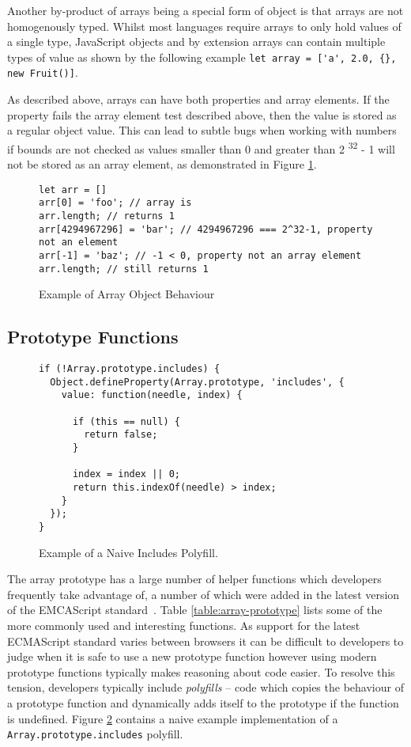 \documentclass[]{final_report}
\begin{document}
Another by-product of arrays being a special form of object is that arrays are not homogenously typed. Whilst most languages require arrays to only hold values of a single type, JavaScript objects and by extension arrays can contain multiple types of value as shown by the following example \lstinline|let array = ['a', 2.0, {}, new Fruit()]|. 

As described above, arrays can have both properties and array elements. If the property fails the array element test described above, then the value is stored as a regular object value. This can lead to subtle bugs when working with numbers if bounds are not checked as values smaller than 0 and greater than 2  \textsuperscript{32} - 1 will not be stored as an array element, as demonstrated in Figure \ref{fig:js-array-max-length}.

\begin{figure}[t]
\begin{verbatim}
let arr = []
arr[0] = 'foo'; // array is 
arr.length; // returns 1
arr[4294967296] = 'bar'; // 4294967296 === 2^32-1, property not an element
arr[-1] = 'baz'; // -1 < 0, property not an array element
arr.length; // still returns 1
\end{verbatim}
\caption{\label{fig:js-array-max-length} Example of Array Object Behaviour}
\end{figure}

\subsection{Prototype Functions} \label{sec:array-prototype-functions}

\begin{figure}[t]
\begin{lstlisting}
if (!Array.prototype.includes) {
  Object.defineProperty(Array.prototype, 'includes', {
    value: function(needle, index) {

      if (this == null) {
        return false;
      }

      index = index || 0;
      return this.indexOf(needle) > index;
    }
  });
}
\end{lstlisting}
\caption{\label{fig:naive-includes-polyfill} Example of a Naive Includes Polyfill.}
\end{figure}

The array prototype has a large number of helper functions which developers frequently take advantage of, a number of which were added in the latest version of the EMCAScript standard~\cite{EcmaScript}. Table \ref{table:array-prototype} lists some of the more commonly used and interesting functions. As support for the latest ECMAScript standard varies between browsers it can be difficult to developers to judge when it is safe to use a new prototype function however using modern prototype functions typically makes reasoning about code easier. To resolve this tension, developers typically include \textit{polyfills} -- code which copies the behaviour of a prototype function and dynamically adds itself to the prototype if the function is undefined. Figure \ref{fig:naive-includes-polyfill} contains a naive example implementation of a \lstinline|Array.prototype.includes| polyfill.
\end{document}
